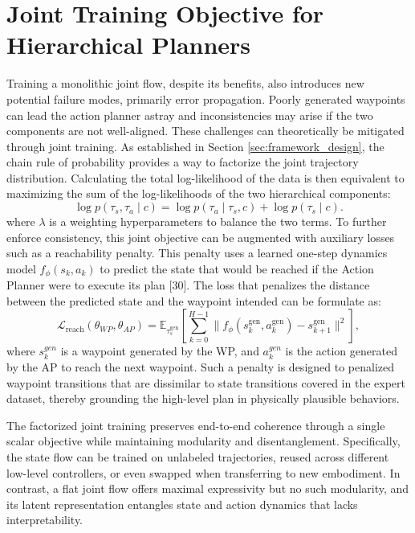 \section{Joint Training Objective for Hierarchical Planners}
\label{app:joint_training}
Training a monolithic joint flow, despite its benefits, also introduces new potential failure modes, primarily error propagation. Poorly generated waypoints can lead the action planner astray and inconsistencies may arise if the two components are not well-aligned. These challenges can theoretically be mitigated through joint training.
As established in Section \ref{sec:framework_design}, the chain rule of probability provides a way to factorize the joint trajectory distribution. Calculating the total log-likelihood of the data is then equivalent to maximizing the sum of the log-likelihoods of the two hierarchical components:
\begin{equation}
	\log p(\tau_s, \tau_a \mid c) = \log p(\tau_a \mid \tau_s, c) + \log p(\tau_s \mid c).
\end{equation}
where $\lambda$ is a weighting hyperparameters to balance the two terms.
To further enforce consistency, this joint objective can be augmented with auxiliary losses such as a reachability penalty. This penalty uses a learned one-step dynamics model $f_\phi (s_k, a_k)$ to predict the state that would be reached if the Action Planner were to execute its plan [30]. The loss that penalizes the distance between the predicted state and the waypoint intended can be formulate as:
\begin{equation}
	\mathcal{L}_{\text{reach}}(\theta_{WP},\theta_{AP})=\mathbb{E}_{\tau_s^{\text{gen}}}\left[\sum_{k=0}^{H-1}\|f_{\phi}(s_k^{\text{gen}},a_k^{\text{gen}})-s_{k+1}^{\text{gen}}\|^2\right],
\end{equation}
where $s_{k}^{gen}$ is a waypoint generated by the WP, and $a_{k}^{gen}$ is the action generated by the AP to reach the next waypoint. Such a penalty is designed to penalized waypoint transitions that are dissimilar to state transitions covered in the expert dataset, thereby grounding the high-level plan in physically plausible behaviors.

The factorized joint training preserves end-to-end coherence through a single scalar objective while maintaining modularity and disentanglement. Specifically, the state flow can be trained on unlabeled trajectories, reused across different low-level controllers, or even swapped when transferring to new embodiment. In contrast, a flat joint flow offers maximal expressivity but no such modularity, and its latent representation entangles state and action dynamics that lacks interpretability.


